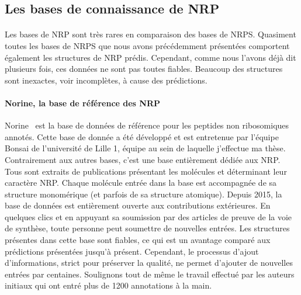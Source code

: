 \documentclass[12pt,french,twoside]{report}
\begin{document}
\subsection{Les bases de connaissance de NRP}

\paragraph{}Les bases de NRP sont très rares en comparaison des bases de NRPS.
Quasiment toutes les bases de NRPS que nous avons précédemment présentées comportent également les structures de NRP prédis.
Cependant, comme nous l'avons déjà dit plusieurs fois, ces données ne sont pas toutes fiables.
Beaucoup des structures sont inexactes, voir incomplètes, à cause des prédictions.

\paragraph{Norine, la base de référence des NRP}
Norine~\cite{caboche_norine:_2008} est la base de données de référence pour les peptides non ribosomiques annotés.
Cette base de donnée a été développé et est entretenue par l'équipe Bonsai de l'université de Lille 1, équipe au sein de laquelle j'effectue ma thèse.
Contrairement aux autres bases, c'est une base entièrement dédiée aux NRP.
Tous sont extraits de publications présentant les molécules et déterminant leur caractère NRP.
Chaque molécule entrée dans la base est accompagnée de sa structure monomérique (et parfois de sa structure atomique).
Depuis 2015, la base de données est entièrement ouverte aux contributions extérieures.
En quelques clics et en appuyant sa soumission par des articles de preuve de la voie de synthèse, toute personne peut soumettre de nouvelles entrées.
Les structures présentes dans cette base sont fiables, ce qui est un avantage comparé aux prédictions présentées jusqu'à présent.
Cependant, le processus d'ajout d'informations, strict pour préserver la qualité, ne permet d'ajouter de nouvelles entrées par centaines.
Soulignons tout de même le travail effectué par les auteurs initiaux qui ont entré plus de 1200 annotations à la main.
\end{document}

